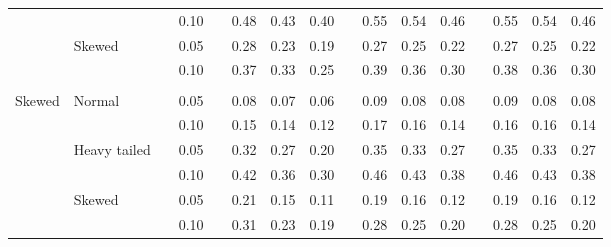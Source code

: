 \documentclass[12pt]{article} %
\begin{document}
\begin{table}[ht]
\begin{scriptsize}
\begin{center}
\begin{tabular}{ll p{.1cm} c p{.1cm} rrr p{.1cm} rrr p{.1cm} rrr}
             &              && 0.10 &&   0.48 & 0.43 & 0.40 && 0.55 & 0.54 & 0.46 && 0.55 & 0.54 & 0.46 \\ 
             & Skewed       && 0.05 &&   0.28 & 0.23 & 0.19 && 0.27 & 0.25 & 0.22 && 0.27 & 0.25 & 0.22 \\ 
             &              && 0.10 &&   0.37 & 0.33 & 0.25 && 0.39 & 0.36 & 0.30 && 0.38 & 0.36 & 0.30 \\ 
             &&&&&&&&&&&&&&&\\
Skewed       & Normal       && 0.05 &&   0.08 & 0.07 & 0.06 && 0.09 & 0.08 & 0.08 && 0.09 & 0.08 & 0.08 \\ 
             &              && 0.10 &&   0.15 & 0.14 & 0.12 && 0.17 & 0.16 & 0.14 && 0.16 & 0.16 & 0.14 \\ 
             & Heavy tailed && 0.05 &&   0.32 & 0.27 & 0.20 && 0.35 & 0.33 & 0.27 && 0.35 & 0.33 & 0.27 \\ 
             &              && 0.10 &&   0.42 & 0.36 & 0.30 && 0.46 & 0.43 & 0.38 && 0.46 & 0.43 & 0.38 \\ 
             & Skewed       && 0.05 &&   0.21 & 0.15 & 0.11 && 0.19 & 0.16 & 0.12 && 0.19 & 0.16 & 0.12 \\ 
             &              && 0.10 &&   0.31 & 0.23 & 0.19 && 0.28 & 0.25 & 0.20 && 0.28 & 0.25 & 0.20 \\ 



\end{tabular}
\end{center}
\end{scriptsize}
\end{table}
\end{document}
